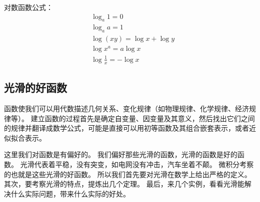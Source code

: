 对数函数公式：
\begin{align*}
&\log _a1=0 \\
&\log _aa=1 \\
&\log \left( xy \right) =\log x+\log y \\
&\log x^a=a\log x \\
&\log \frac{1}{x}=-\log x
\end{align*}

\subsection{光滑的好函数}

函数使我们可以用代数描述几何关系、变化规律（如物理规律、化学规律、经济规律等）。
建立函数的过程首先是确定自变量、因变量及其意义，然后找出它们之间的规律并翻译成数学公式，可能是直接可以用初等函数及其组合嵌套表示，或者近似拟合表示。

这里我们对函数是有偏好的。
我们偏好那些光滑的函数，光滑的函数是好的函数。
光滑代表着平稳，没有突变，如电网没有冲击，汽车坐着不颠。
微积分考察的也就是这些光滑的好函数。
所以我们首先要对光滑在数学上给出严格的定义。
其次，要考察光滑的特点，提炼出几个定理。
最后，来几个实例，看看光滑能解决什么实际问题，带来什么实际的好处。





